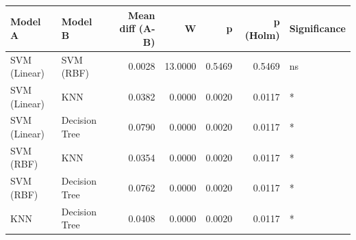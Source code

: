 \begin{tabular}{llrrrrl}
\toprule
Model A & Model B & Mean diff (A-B) & W & p & p (Holm) & Significance \\
\midrule
SVM (Linear) & SVM (RBF) & 0.0028 & 13.0000 & 0.5469 & 0.5469 & ns \\
SVM (Linear) & KNN & 0.0382 & 0.0000 & 0.0020 & 0.0117 & * \\
SVM (Linear) & Decision Tree & 0.0790 & 0.0000 & 0.0020 & 0.0117 & * \\
SVM (RBF) & KNN & 0.0354 & 0.0000 & 0.0020 & 0.0117 & * \\
SVM (RBF) & Decision Tree & 0.0762 & 0.0000 & 0.0020 & 0.0117 & * \\
KNN & Decision Tree & 0.0408 & 0.0000 & 0.0020 & 0.0117 & * \\
\bottomrule
\end{tabular}
